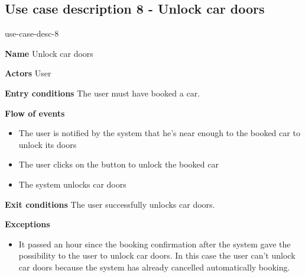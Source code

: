 \subsection{Use case description 8 - Unlock car doors}
\begin{labeling}{use-case-desc-8}
		\item[\textbf{Name}] Unlock car doors
		\item[\textbf{Actors}] User
		\item[\textbf{Entry conditions}] The user must have booked a car.
		\item[\textbf{Flow of events}]
			\begin{itemize}
				\item[]
				\item The user is notified by the system that he's near enough to the booked car to unlock its doors
				\item The user clicks on the button to unlock the booked car
				\item The system unlocks car doors
			\end{itemize}
		\item[\textbf{Exit conditions}] The user successfully unlocks car doors.
		\item[\textbf{Exceptions}]
			\begin{itemize}
				\item[]
				\item It passed an hour since the booking confirmation after the system gave the possibility to the user to unlock car doors. In this case the user can't unlock car doors because the system has already cancelled automatically booking.  
			\end{itemize}
	\end{labeling}
	
